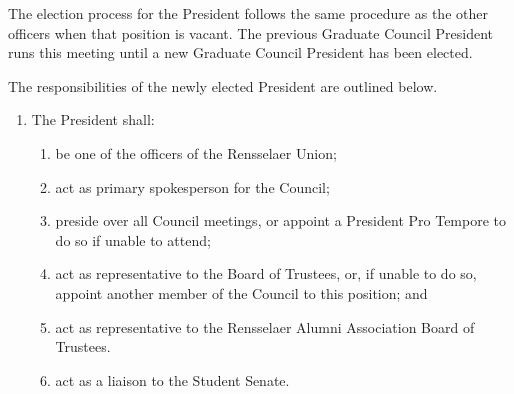 \documentclass{uniondoc}
\begin{document}
The election process for the President follows the same procedure as the other officers when that position is vacant. The previous Graduate Council President runs this meeting until a new Graduate Council President has been elected.

The responsibilities of the newly elected President are outlined below.

\begin{enumerate}
\item The President shall:
  \begin{enumerate}
  \item be one of the officers of the Rensselaer Union;
  \item act as primary spokesperson for the Council;
  \item preside over all Council meetings, or appoint a President Pro Tempore to do so if unable to attend;
  \item act as representative to the Board of Trustees, or, if unable to do so, appoint another member of the Council to this position; and
  \item act as representative to the Rensselaer Alumni Association Board of Trustees.
  \item act as a liaison to the Student Senate.
  \end{enumerate}
\end{enumerate}

\end{document}
